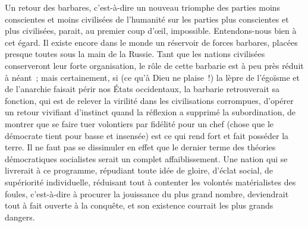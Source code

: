 \documentclass[french,twoside]{book} %
\begin{document}
Un retour des barbares, c’est-à-dire un nouveau triomphe des parties moins conscientes et moins civilisées de l’humanité sur les parties plus conscientes et plus civilisées, parait, au premier coup d’œil, impossible. Entendons-nous bien à cet égard. Il existe encore dans le monde un réservoir de forces barbares, placées presque toutes sous la main de la Russie. Tant que les nations civilisées conserveront leur forte organisation, le rôle de cette barbarie est à peu près réduit à néant ; mais certainement, si (ce qu’à Dieu ne plaise !) la lèpre de l’égoïsme et de l’anarchie faisait périr nos États occidentaux, la barbarie retrouverait sa fonction, qui est de relever la virilité dans les civilisations corrompues, d’opérer un retour vivifiant d’instinct quand la réflexion a supprimé la subordination, de montrer que se faire tuer volontiers par fidélité pour un chef (chose que le démocrate tient pour basse et insensée) est ce qui rend fort et fait posséder la terre. Il ne faut pas se dissimuler en effet que le dernier terme des théories démocratiques socialistes serait un complet affaiblissement. Une nation qui se livrerait à ce programme, répudiant toute idée de gloire, d’éclat social, de supériorité individuelle, réduisant tout à contenter les volontés matérialistes des foules, c’est-à-dire à procurer la jouissance du plus grand nombre, deviendrait tout à fait ouverte à la conquête, et son existence courrait les plus grands dangers.\par
\end{document}
